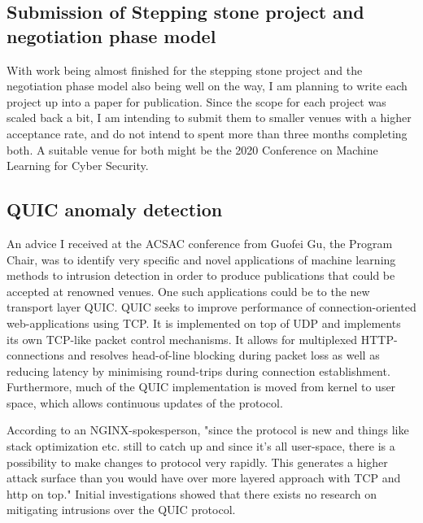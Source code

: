 \documentclass[a4paper,12pt,twoside]{article}
\begin{document}
\subsection{Submission of Stepping stone project and negotiation phase model}

With work being almost finished for the stepping stone project and the negotiation phase model also being well on the way, I am planning to write each project up into a paper for publication. Since the scope for each project was scaled back a bit, I am intending to submit them to smaller venues with a higher acceptance rate, and do not intend to spent more than three months completing both. A suitable venue for both might be the 2020 Conference on Machine Learning for Cyber Security.

\subsection{QUIC anomaly detection}

An advice I received at the ACSAC conference from Guofei Gu, the Program Chair, was to identify very specific and novel applications of machine learning methods to intrusion detection in order to produce publications that could be accepted at renowned venues. One such applications could be to the new transport layer QUIC. QUIC seeks to improve performance of connection-oriented web-applications using TCP. It is implemented on top of UDP and implements its own TCP-like packet control mechanisms. It allows for multiplexed HTTP-connections and resolves head-of-line blocking during packet loss as well as reducing latency by minimising round-trips during connection establishment. Furthermore, much of the QUIC implementation is moved from kernel to user space, which allows continuous updates of the protocol.

According to an NGINX-spokesperson, "since the protocol is new and things like stack optimization etc. still to catch up and since it's all user-space, there is a possibility to make changes to protocol very rapidly. This generates a higher attack surface than you would have over more layered approach with TCP and http on top." Initial investigations showed that there exists no research on mitigating intrusions over the QUIC protocol.%
\end{document}

